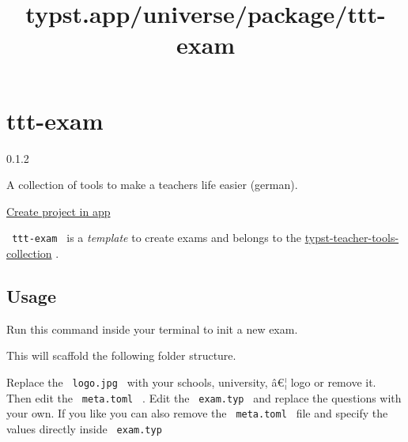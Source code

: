 \title{typst.app/universe/package/ttt-exam}

\label{banner}
\label{template-thumbnail}

\section{ttt-exam}\label{ttt-exam}

{ 0.1.2 }

A collection of tools to make a teachers life easier (german).

\href{/app?template=ttt-exam&version=0.1.2}{Create project in app}

\label{readme}
\texttt{\ ttt-exam\ } is a \emph{template} to create exams and belongs
to the
\href{https://github.com/jomaway/typst-teacher-templates}{typst-teacher-tools-collection}
.

\subsection{Usage}\label{usage}

Run this command inside your terminal to init a new exam.

\begin{Shaded}
\begin{Highlighting}[]
\end{Highlighting}
\end{Shaded}

This will scaffold the following folder structure.

\begin{Shaded}
\begin{Highlighting}[]
\end{Highlighting}
\end{Shaded}

Replace the \texttt{\ logo.jpg\ } with your schools, university, â€¦
logo or remove it. Then edit the \texttt{\ meta.toml\ } . Edit the
\texttt{\ exam.typ\ } and replace the questions with your own. If you
like you can also remove the \texttt{\ meta.toml\ } file and specify the
values directly inside \texttt{\ exam.typ\ }

